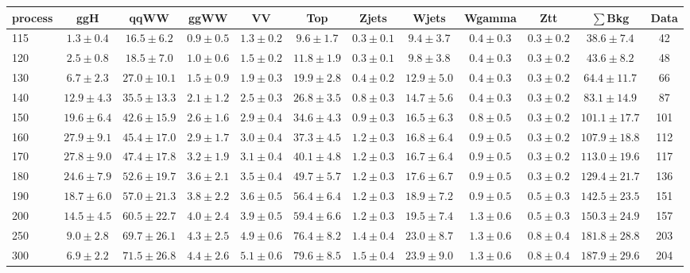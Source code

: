 \begin{table}
{\footnotesize
 \begin{center}
 \begin{tabular}{l c c c c c c c c c c c }
 \hline
 process & ggH & qqWW & ggWW & VV & Top & Zjets & Wjets & Wgamma & Ztt & $\sum$Bkg & Data \\
 \hline
115 & $1.3\pm0.4$ & $16.5\pm6.2$ & $0.9\pm0.5$ & $1.3\pm0.2$ & $9.6\pm1.7$ & $0.3\pm0.1$ & $9.4\pm3.7$ & $0.4\pm0.3$ & $0.3\pm0.2$ & $38.6\pm7.4$ & 42 \\
120 & $2.5\pm0.8$ & $18.5\pm7.0$ & $1.0\pm0.6$ & $1.5\pm0.2$ & $11.8\pm1.9$ & $0.3\pm0.1$ & $9.8\pm3.8$ & $0.4\pm0.3$ & $0.3\pm0.2$ & $43.6\pm8.2$ & 48 \\
130 & $6.7\pm2.3$ & $27.0\pm10.1$ & $1.5\pm0.9$ & $1.9\pm0.3$ & $19.9\pm2.8$ & $0.4\pm0.2$ & $12.9\pm5.0$ & $0.4\pm0.3$ & $0.3\pm0.2$ & $64.4\pm11.7$ & 66 \\
140 & $12.9\pm4.3$ & $35.5\pm13.3$ & $2.1\pm1.2$ & $2.5\pm0.3$ & $26.8\pm3.5$ & $0.8\pm0.3$ & $14.7\pm5.6$ & $0.4\pm0.3$ & $0.3\pm0.2$ & $83.1\pm14.9$ & 87 \\
150 & $19.6\pm6.4$ & $42.6\pm15.9$ & $2.6\pm1.6$ & $2.9\pm0.4$ & $34.6\pm4.3$ & $0.9\pm0.3$ & $16.5\pm6.3$ & $0.8\pm0.5$ & $0.3\pm0.2$ & $101.1\pm17.7$ & 101 \\
160 & $27.9\pm9.1$ & $45.4\pm17.0$ & $2.9\pm1.7$ & $3.0\pm0.4$ & $37.3\pm4.5$ & $1.2\pm0.3$ & $16.8\pm6.4$ & $0.9\pm0.5$ & $0.3\pm0.2$ & $107.9\pm18.8$ & 112 \\
170 & $27.8\pm9.0$ & $47.4\pm17.8$ & $3.2\pm1.9$ & $3.1\pm0.4$ & $40.1\pm4.8$ & $1.2\pm0.3$ & $16.7\pm6.4$ & $0.9\pm0.5$ & $0.3\pm0.2$ & $113.0\pm19.6$ & 117 \\
180 & $24.6\pm7.9$ & $52.6\pm19.7$ & $3.6\pm2.1$ & $3.5\pm0.4$ & $49.7\pm5.7$ & $1.2\pm0.3$ & $17.6\pm6.7$ & $0.9\pm0.5$ & $0.3\pm0.2$ & $129.4\pm21.7$ & 136 \\
190 & $18.7\pm6.0$ & $57.0\pm21.3$ & $3.8\pm2.2$ & $3.6\pm0.5$ & $56.4\pm6.4$ & $1.2\pm0.3$ & $18.9\pm7.2$ & $0.9\pm0.5$ & $0.5\pm0.3$ & $142.5\pm23.5$ & 151 \\
200 & $14.5\pm4.5$ & $60.5\pm22.7$ & $4.0\pm2.4$ & $3.9\pm0.5$ & $59.4\pm6.6$ & $1.2\pm0.3$ & $19.5\pm7.4$ & $1.3\pm0.6$ & $0.5\pm0.3$ & $150.3\pm24.9$ & 157 \\
250 & $9.0\pm2.8$ & $69.7\pm26.1$ & $4.3\pm2.5$ & $4.9\pm0.6$ & $76.4\pm8.2$ & $1.4\pm0.4$ & $23.0\pm8.7$ & $1.3\pm0.6$ & $0.8\pm0.4$ & $181.8\pm28.8$ & 203 \\
300 & $6.9\pm2.2$ & $71.5\pm26.8$ & $4.4\pm2.6$ & $5.1\pm0.6$ & $79.6\pm8.5$ & $1.5\pm0.4$ & $23.9\pm9.0$ & $1.3\pm0.6$ & $0.8\pm0.4$ & $187.9\pm29.6$ & 204 \\

\end{tabular}
\end{center}}
\end{table}
